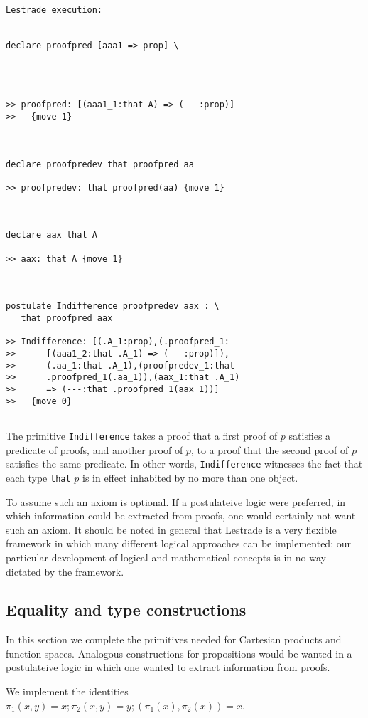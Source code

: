 \documentclass[12pt]{article}
\begin{document}
\begin{verbatim}Lestrade execution:


declare proofpred [aaa1 => prop] \
   



>> proofpred: [(aaa1_1:that A) => (---:prop)]
>>   {move 1}



declare proofpredev that proofpred aa

>> proofpredev: that proofpred(aa) {move 1}



declare aax that A

>> aax: that A {move 1}



postulate Indifference proofpredev aax : \
   that proofpred aax

>> Indifference: [(.A_1:prop),(.proofpred_1:
>>      [(aaa1_2:that .A_1) => (---:prop)]),
>>      (.aa_1:that .A_1),(proofpredev_1:that
>>      .proofpred_1(.aa_1)),(aax_1:that .A_1)
>>      => (---:that .proofpred_1(aax_1))]
>>   {move 0}


\end{verbatim}

The primitive {\tt Indifference} takes a proof that a first proof of $p$ satisfies a predicate of proofs, and another proof of $p$, to a proof that the second proof of $p$ satisfies the same predicate.  In other words, {\tt Indifference} witnesses the fact that each type {\tt that} $p$ is in effect inhabited by no more than one object.

To assume such an axiom is optional.  If a postulateive logic were preferred, in which information could be extracted from proofs, one would certainly not want such an axiom.  It should be noted in general that Lestrade is a very flexible framework in which many different logical approaches can be implemented:  our particular development of logical and mathematical concepts is in no way dictated by the framework.

\subsection{Equality and type constructions}

In this section we complete the primitives needed for Cartesian products and function spaces.  Analogous constructions for propositions would be wanted
in a postulateive logic in which one wanted to extract information from proofs.

We implement the identities $\pi_1(x,y)=x; \pi_2(x,y)=y; (\pi_1(x),\pi_2(x))=x$.
\end{document}

